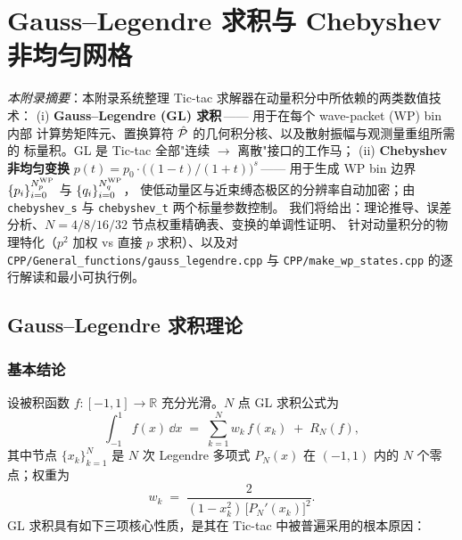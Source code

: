 
\chapter{Gauss--Legendre 求积与 Chebyshev 非均匀网格}
\label{app:C_quadrature}

\noindent\textit{本附录摘要}：本附录系统整理 Tic-tac 求解器在动量积分中所依赖的两类数值技术：
(i) \textbf{Gauss--Legendre (GL) 求积}\,—— 用于在每个 wave-packet (WP) bin 内部
计算势矩阵元、置换算符 $\hat{\mathcal{P}}$ 的几何积分核、以及散射振幅与观测量重组所需的
标量积。GL 是 Tic-tac 全部"连续 $\to$ 离散"接口的工作马；
(ii) \textbf{Chebyshev 非均匀变换} $p(t)=p_0\cdot\bigl((1-t)/(1+t)\bigr)^{s}$\,——
用于生成 WP bin 边界 $\{p_i\}_{i=0}^{{N_{p}^{\text{WP}}}}$ 与 $\{q_i\}_{i=0}^{{N_{q}^{\text{WP}}}}$，
使低动量区与近束缚态极区的分辨率自动加密；由 \texttt{chebyshev\_s}
与 \texttt{chebyshev\_t} 两个标量参数控制。
我们将给出：理论推导、误差分析、$N=4/8/16/32$ 节点权重精确表、变换的单调性证明、
针对动量积分的物理特化（$p^{2}$ 加权 vs 直接 $p$ 求积）、以及对
\texttt{CPP/General\_functions/gauss\_legendre.cpp} 与 \texttt{CPP/make\_wp\_states.cpp}
的逐行解读和最小可执行例。


\section{Gauss--Legendre 求积理论}
\label{sec:appC:gl_theory}

\subsection{基本结论}

设被积函数 $f:[-1,1]\to\mathbb{R}$ 充分光滑。$N$ 点 GL 求积公式为
\begin{equation}
  \int_{-1}^{1} f(x)\,\dd x \;=\;\sum_{k=1}^{N} w_k\,f(x_k) \;+\; R_N(f),
  \label{eq:appC:gl_basic}
\end{equation}
其中节点 $\{x_k\}_{k=1}^{N}$ 是 $N$ 次 Legendre 多项式 $P_N(x)$ 在 $(-1,1)$ 内的
$N$ 个零点；权重为
\begin{equation}
  w_k \;=\; \frac{2}{(1-x_k^{2})\,\bigl[P_N'(x_k)\bigr]^{2}}.
  \label{eq:appC:gl_weight}
\end{equation}
GL 求积具有如下三项核心性质，是其在 Tic-tac 中被普遍采用的根本原因：

